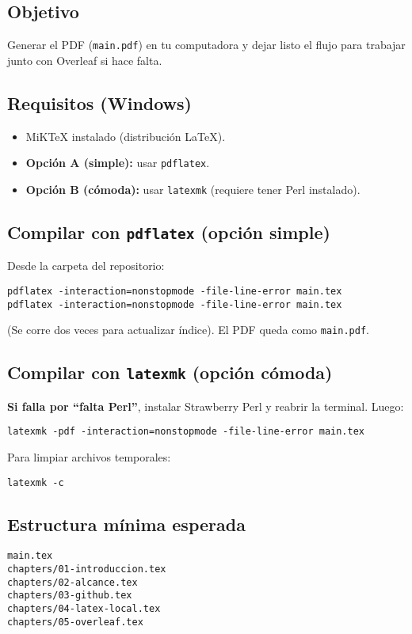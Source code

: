 \subsection*{Objetivo}
Generar el PDF (\texttt{main.pdf}) en tu computadora y dejar listo el flujo para trabajar junto con Overleaf si hace falta.

\subsection*{Requisitos (Windows)}
\begin{itemize}
  \item MiKTeX instalado (distribución \LaTeX{}).
  \item \textbf{Opción A (simple):} usar \texttt{pdflatex}.
  \item \textbf{Opción B (cómoda):} usar \texttt{latexmk} (requiere tener Perl instalado).
\end{itemize}

\subsection*{Compilar con \texttt{pdflatex} (opción simple)}
Desde la carpeta del repositorio:
\begin{verbatim}
pdflatex -interaction=nonstopmode -file-line-error main.tex
pdflatex -interaction=nonstopmode -file-line-error main.tex
\end{verbatim}
(Se corre dos veces para actualizar índice). El PDF queda como \texttt{main.pdf}.

\subsection*{Compilar con \texttt{latexmk} (opción cómoda)}
\textbf{Si falla por ``falta Perl''}, instalar Strawberry Perl y reabrir la terminal. Luego:
\begin{verbatim}
latexmk -pdf -interaction=nonstopmode -file-line-error main.tex
\end{verbatim}
Para limpiar archivos temporales:
\begin{verbatim}
latexmk -c
\end{verbatim}

\subsection*{Estructura mínima esperada}
\begin{verbatim}
main.tex
chapters/01-introduccion.tex
chapters/02-alcance.tex
chapters/03-github.tex
chapters/04-latex-local.tex
chapters/05-overleaf.tex
\end{verbatim}

